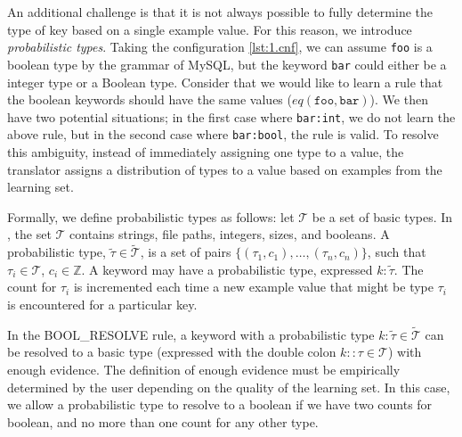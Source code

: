 An additional challenge is that it is not always possible to fully determine the type of key based on a single example value. 
For this reason, we introduce {\emph {probabilistic types}}.
Taking the configuration \ref{lst:1.cnf}, we can assume {\tt foo} is a boolean type by the grammar of MySQL,
  but the keyword {\tt bar} could either be a integer type or a Boolean type.
Consider that we would like to learn a rule that the boolean keywords should have the same values ($eq(\texttt{foo},\texttt{bar})$).
We then have two potential situations; in the first case where {\tt bar:int}, we do not learn the above rule, but in the second case where {\tt bar:bool}, the rule is valid.
To resolve this ambiguity, instead of immediately assigning one type to a value, the translator assigns a distribution of types to a value based on examples from the learning set.

Formally, we define probabilistic types as follows: let $\mathcal{T}$ be a set of basic types.
In \app, the set $\mathcal{T}$ contains strings, file paths, integers, sizes, and booleans. 
A probabilistic type, $\tilde{\tau} \in \tilde{\mathcal{T}}$, is a set of pairs $\{(\tau_1, c_1),\ldots,(\tau_n, c_n)\}$, such that $\tau_i \in \mathcal{T}$, $c_i \in \mathbb{Z}$. 
A keyword may have a probabilistic type, expressed $k:\tilde{\tau}$.
The count for $\tau_i$ is incremented each time a new example value that might be type $\tau_i$ is encountered for a particular key.


In the {\scriptsize BOOL\_RESOLVE} rule, a keyword with a probabilistic type $k : \tilde{\tau} \in \tilde{\mathcal{T}}$ can be resolved to a basic type (expressed with the double colon $ k :: \tau \in \mathcal{T}$) with enough evidence.
The definition of enough evidence must be empirically determined by the user depending on the quality of the learning set.
In this case, we allow a probabilistic type to resolve to a boolean if we have two counts for boolean, and no more than one count for any other type.
 
